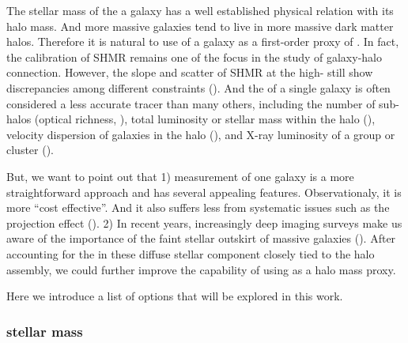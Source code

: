 \documentclass[fleqn,usenatbib,useAMS,english]{mnras}
\begin{document}
    The stellar mass of the a galaxy has a well established physical relation with its halo mass.
    And more massive galaxies tend to live in more massive dark matter halos.
    Therefore it is natural to use \mstar{} of a galaxy as a first-order proxy of \mvir{}.
    In fact, the calibration of SHMR remains one of the focus in the study of galaxy-halo connection.
    However, the slope and scatter of SHMR at the high-\mstar{} still show discrepancies among
    different constraints (\addref{}).
    And the \mstar{} of a single galaxy is often considered a less accurate \mvir{} tracer
    than many others, including the number of sub-halos (optical richness, \addref{}),
    total luminosity or stellar mass within the halo (\addref{}), velocity dispersion of galaxies
    in the halo (\addref{}), and X-ray luminosity of a group or cluster (\addref{}).

    But, we want to point out that
    1) \mstar{} measurement of one galaxy is a more straightforward approach and has several
    appealing features. Observationaly, it is more ``cost effective''. And it also suffers less
    from systematic issues such as the projection effect (\addref{}).
    2) In recent years, increasingly deep imaging surveys make us aware of the importance of the
    faint stellar outskirt of massive galaxies (\addref{}).
    After accounting for the \mstar{} in these diffuse stellar component closely tied to the
    halo assembly, we could further improve the capability of using \mstar{} as a halo mass proxy.

    Here we introduce a list of \mstar{} options that will be explored in this work.

\subsubsection{\cmodel{} stellar mass}
    \label{sec:mcmodel}

\end{document}
